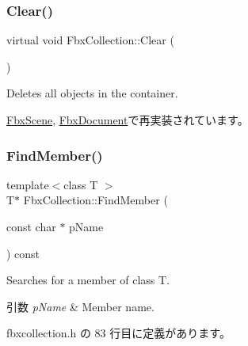 \subsubsection{\texorpdfstring{Clear()}{Clear()}}
{\footnotesize\ttfamily virtual void Fbx\+Collection\+::\+Clear (\begin{DoxyParamCaption}{ }\end{DoxyParamCaption})\hspace{0.3cm}{\ttfamily [virtual]}}



Deletes all objects in the container. 



\hyperlink{class_fbx_scene_ab578ff733eb8f6af89ff1645852966cd}{Fbx\+Scene}, \hyperlink{class_fbx_document_ac8fa73e98a73c4f6637466e58d069bbe}{Fbx\+Document}で再実装されています。

\mbox{\label{class_fbx_collection_ac68aa37ee6d89cb3cc066ca1407cb505}} 
\subsubsection{\texorpdfstring{Find\+Member()}{FindMember()}\hspace{0.1cm}{\footnotesize\ttfamily [1/2]}}
{\footnotesize\ttfamily template$<$class T $>$ \\
T$\ast$ Fbx\+Collection\+::\+Find\+Member (\begin{DoxyParamCaption}\item[{const char $\ast$}]{p\+Name }\end{DoxyParamCaption}) const\hspace{0.3cm}{\ttfamily [inline]}}

Searches for a member of class T. 
\begin{DoxyParams}{引数}
{\em p\+Name} & Member name. \\
\hline
\end{DoxyParams}


 fbxcollection.\+h の 83 行目に定義があります。

\mbox{\label{class_fbx_collection_a72875fa801308b233f5e1cb04cf66bb4}} 
